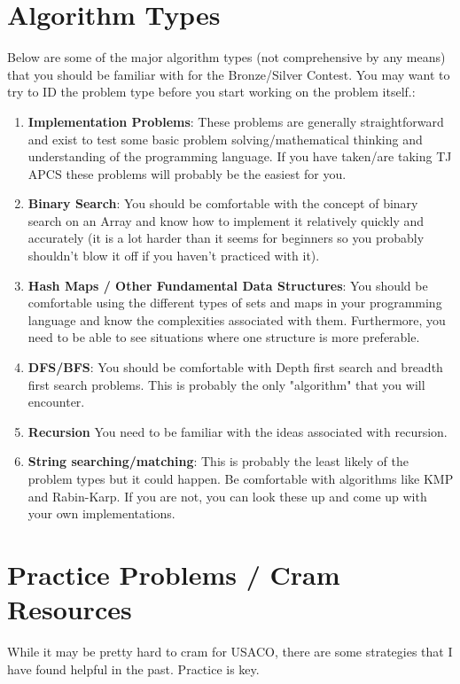 \documentclass{article}
\begin{document}
\section{Algorithm Types}
Below are some of the major algorithm types (not comprehensive by any means) that you should be familiar with for the Bronze/Silver Contest. You may want to try to ID the problem type before you start working on the problem itself.:
\begin{enumerate}
    \item \textbf{Implementation Problems}: These problems are generally straightforward and exist to test some basic problem solving/mathematical thinking and understanding of the programming language. If you have taken/are taking TJ APCS these problems will probably be the easiest for you.
    
    \item \textbf{Binary Search}: You should be comfortable with the concept of binary search on an Array and know how to implement it relatively quickly and accurately (it is a lot harder than it seems for beginners so you probably shouldn't blow it off if you haven't practiced with it).
    
    \item \textbf{Hash Maps / Other Fundamental Data Structures}: You should be comfortable using the different types of sets and maps in your programming language and know the complexities associated with them. Furthermore, you need to be able to see situations where one structure is more preferable.  
    
    \item \textbf{DFS/BFS}: You should be comfortable with Depth first search and breadth first search problems. This is probably the only "algorithm" that you will encounter.
    
    \item \textbf{Recursion} You need to be familiar with the ideas associated with recursion. 
    
    \item \textbf{String searching/matching}: This is probably the least likely of the problem types but it could happen. Be comfortable with algorithms like KMP and Rabin-Karp. If you are not, you can look these up and come up with your own implementations.
\end{enumerate}


\section{Practice Problems / Cram Resources}
While it may be pretty hard to cram for USACO, there are some strategies that I have found helpful in the past. Practice is key.
\end{document}
